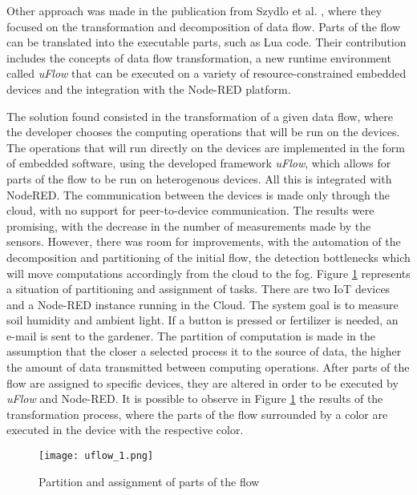\par Other approach was made in the publication from Szydlo et al. \cite{flow_based_programming_fog}, where they focused on the transformation and decomposition of data flow. Parts of the flow can be translated into the executable parts, such as Lua code. Their contribution includes the concepts of data flow transformation, a new runtime environment called \textit{uFlow} that can be executed on a variety of resource-constrained embedded devices and the integration with the Node-RED platform. 
\par The solution found consisted in the transformation of a given data flow, where the developer chooses the computing operations that will be run on the devices. The operations that will run directly on the devices are implemented in the form of embedded software, using the developed framework \textit{uFlow}, which allows for parts of the flow to be run on heterogenous devices. All this is integrated with NodeRED. The communication between the devices is made only through the cloud, with no support for peer-to-device communication. The results were promising, with the decrease in the number of measurements made by the sensors. However, there was room for improvements, with the automation of the decomposition and partitioning of the initial flow, the detection bottlenecks which will move computations accordingly from the cloud to the fog. Figure \ref{fig:uflow_1} represents a situation of partitioning and assignment of tasks. There are two IoT devices and a Node-RED instance running in the Cloud. The system goal is to measure soil humidity and ambient light. If a button is pressed or fertilizer is needed, an e-mail is sent to the gardener. The partition of computation is made in the assumption that the closer a selected process it to the source of data, the higher the amount of data transmitted between computing operations. After parts of the flow are assigned to specific devices, they are altered in order to be executed by \textit{uFlow} and Node-RED. It is possible to observe in Figure \ref{fig:uflow_1} the results of the transformation process, where the parts of the flow surrounded by a color are executed in the device with the respective color.

\begin{figure}[h]
\caption{Partition and assignment of parts of the flow \cite{flow_based_programming_fog}}
\label{fig:uflow_1}
\centering
\texttt{[image: uflow\_1.png]}
\end{figure}

